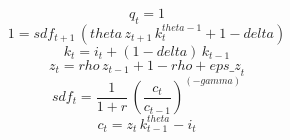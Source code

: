 \begin{dmath}
{q}_{t}=1
\end{dmath}
\begin{dmath}
1={sdf}_{t+1}\, \left({theta}\, {z}_{t+1}\, {k}_{t}^{{theta}-1}+1-{delta}\right)
\end{dmath}
\begin{dmath}
{k}_{t}={i}_{t}+\left(1-{delta}\right)\, {k}_{t-1}
\end{dmath}
\begin{dmath}
{z}_{t}={rho}\, {z}_{t-1}+1-{rho}+{eps\_z}_{t}
\end{dmath}
\begin{dmath}
{sdf}_{t}=\frac{1}{1+{r}}\, \left(\frac{{c}_{t}}{{c}_{t-1}}\right)^{\left(-{gamma}\right)}
\end{dmath}
\begin{dmath}
{c}_{t}={z}_{t}\, {k}_{t-1}^{{theta}}-{i}_{t}
\end{dmath}
